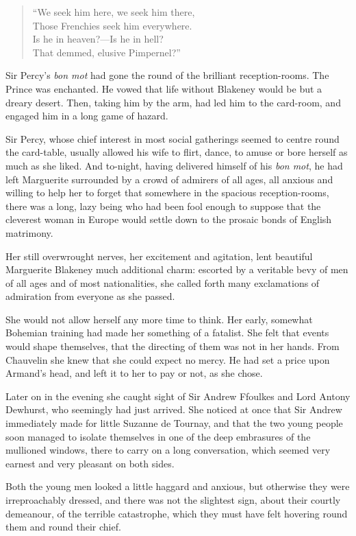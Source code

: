 \documentclass[paper=a5,BCOR=7mm,twoside,DIV=calc,12pt,usegeometry,chapterprefix,endperiod,headings=big]{scrbook}
\begin{document}
\blockquote{
\enquote{We seek him here, we seek him there,\\
Those Frenchies seek him everywhere.\\
Is he in heaven?---Is he in hell?\\
That demmed, elusive Pimpernel?}
}

Sir Percy's \textit{bon mot} had gone the round of the brilliant reception-rooms. The Prince was enchanted. He vowed that life without Blakeney would be but a dreary desert. Then, taking him by the arm, had led him to the card-room, and engaged him in a long game of hazard.

Sir Percy, whose chief interest in most social gatherings seemed to centre round the card-table, usually allowed his wife to flirt, dance, to amuse or bore herself as much as she liked. And to-night, having delivered himself of his \textit{bon mot}, he had left Marguerite surrounded by a crowd of admirers of all ages, all anxious and willing to help her to forget that somewhere in the spacious reception-rooms, there was a long, lazy being who had been fool enough to suppose that the cleverest woman in Europe would settle down to the prosaic bonds of English matrimony.

Her still overwrought nerves, her excitement and agitation, lent beautiful Marguerite Blakeney much additional charm: escorted by a veritable bevy of men of all ages and of most nationalities, she called forth many exclamations of admiration from everyone as she passed.

She would not allow herself any more time to think. Her early, somewhat Bohemian training had made her something of a fatalist. She felt that events would shape themselves, that the directing of them was not in her hands. From Chauvelin she knew that she could expect no mercy. He had set a price upon Armand's head, and left it to her to pay or not, as she chose.

Later on in the evening she caught sight of Sir Andrew Ffoulkes and Lord Antony Dewhurst, who seemingly had just arrived. She noticed at once that Sir Andrew immediately made for little Suzanne de Tournay, and that the two young people soon managed to isolate themselves in one of the deep embrasures of the mullioned windows, there to carry on a long conversation, which seemed very earnest and very pleasant on both sides.

Both the young men looked a little haggard and anxious, but otherwise they were irreproachably dressed, and there was not the slightest sign, about their courtly demeanour, of the terrible catastrophe, which they must have felt hovering round them and round their chief.
\end{document}

